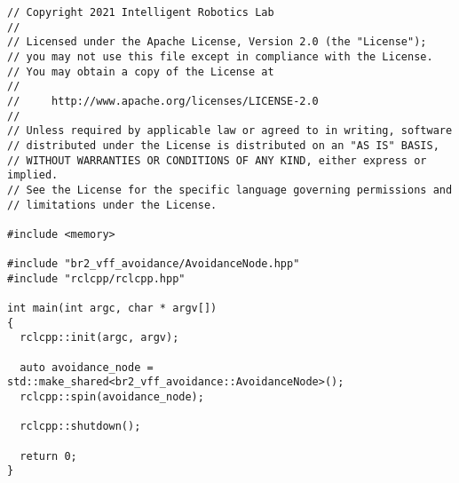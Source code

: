  \footnotesize
\begin{tcolorbox}[sharp corners, colframe=gray!80, colback=LightGray, left=0pt, top=0pt, bottom=0pt, title=\texttt{br2\_vff\_avoidance/src/avoidance\_vff\_main.cpp}]
  \begin{verbatim}
// Copyright 2021 Intelligent Robotics Lab
//
// Licensed under the Apache License, Version 2.0 (the "License");
// you may not use this file except in compliance with the License.
// You may obtain a copy of the License at
//
//     http://www.apache.org/licenses/LICENSE-2.0
//
// Unless required by applicable law or agreed to in writing, software
// distributed under the License is distributed on an "AS IS" BASIS,
// WITHOUT WARRANTIES OR CONDITIONS OF ANY KIND, either express or implied.
// See the License for the specific language governing permissions and
// limitations under the License.

#include <memory>

#include "br2_vff_avoidance/AvoidanceNode.hpp"
#include "rclcpp/rclcpp.hpp"

int main(int argc, char * argv[])
{
  rclcpp::init(argc, argv);

  auto avoidance_node = std::make_shared<br2_vff_avoidance::AvoidanceNode>();
  rclcpp::spin(avoidance_node);

  rclcpp::shutdown();

  return 0;
}
    \end{verbatim}
    \end{tcolorbox}
  \normalsize

